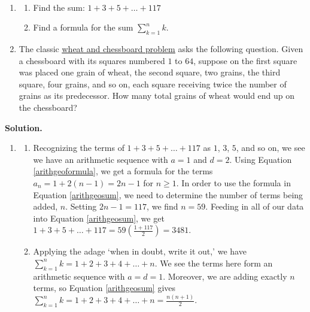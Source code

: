 \documentclass{ximera}
\begin{document}
\begin{example} \label{arithgeosumex} $~$

\begin{enumerate}

\item

\begin{enumerate}
\item  Find the sum: $1 + 3 + 5 + \ldots + 117$

\item Find a formula for the sum $\displaystyle{ \sum_{k=1}^{n} k }$.

\end{enumerate}

\item  The classic \href{https://en.wikipedia.org/wiki/Wheat_and_chessboard_problem}{\underline{wheat and chessboard problem}} asks the following question.  Given a chessboard with its squares numbered $1$ to $64$, suppose  on the first square was placed one grain of wheat, the second square, two grains, the third square, four grains, and so on, each square receiving twice the number of grains as its predecessor.   How many total grains of wheat would end up on the chessboard?

\end{enumerate}

{\bf Solution.}


\begin{enumerate}
\item 
\begin{enumerate}

\item Recognizing the terms of $1 + 3 + 5 + \ldots + 117$ as $1$, $3$, $5$, and so on, we see we have an arithmetic sequence with $a=1$ and $d=2$.  Using Equation \ref{arithgeoformula}, we get a formula for the terms  $a_{n} = 1 + 2(n-1) = 2n-1$ for $n \geq 1$.  In order to use the formula in Equation \ref{arithgeosum}, we need to determine the number of terms being added, $n$.  Setting $2n-1 = 117$, we find $n = 59$.  Feeding in all of our data into Equation \ref{arithgeosum}, we get $1 + 3 + 5 + \ldots + 117 =59 \left(\frac{1+117}{2}\right) = 3481$. 
 
\item Applying the adage `when in doubt, write it out,' we have $\displaystyle{ \sum_{k=1}^{n} k  = 1 + 2 + 3 + 4 + \ldots + n}$.  We see the terms here form an arithmetic sequence with  $a = d = 1$.  Moreover, we are adding exactly $n$ terms, so  Equation \ref{arithgeosum} gives  $\displaystyle{ \sum_{k=1}^{n} k  = 1 + 2 + 3 + 4 + \ldots + n = \frac{n(n+1)}{2}}$.


\end{enumerate}
\end{enumerate}
\end{example}
\end{document}
